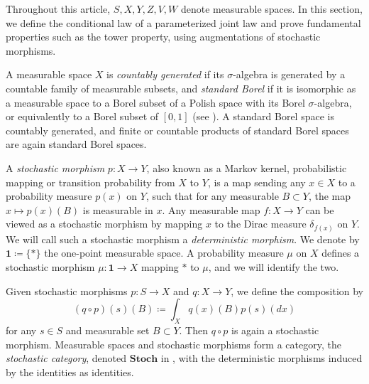 \documentclass[12pt,reqno]{amsart}%
\theoremstyle{plain}
\theoremstyle{definition}
\def\Stoch{\mathbf{Stoch}}
\def\bsone{\boldsymbol{1}}
\begin{document}
Throughout this article, $S,X,Y,Z,V,W$ denote measurable spaces.
In this section, we define the conditional law of a parameterized joint law
and prove fundamental properties such as the tower property, using augmentations of stochastic morphisms.

A measurable space $X$ is \emph{countably generated} if its $\sigma$-algebra is generated by
a countable family of measurable subsets, and \emph{standard Borel} if it is isomorphic as a measurable space
to a Borel subset of a Polish space with its Borel $\sigma$-algebra, or equivalently to a Borel subset of $[0,1]$ (see
\cite[Theorem~3.3.13]{Sri98}).
A standard Borel space is countably generated, and finite or countable products of 
standard Borel spaces are again standard Borel spaces.

A \emph{stochastic morphism} $p\colon X\rightarrow Y$, also known as a Markov kernel, probabilistic mapping
or transition probability from $X$ to $Y$,
 is a map sending any $x\in X$ to a
probability measure $p(x)$ on $Y$, such that for any measurable $B\subset Y$,
the map $x\mapsto p(x)(B)$ is measurable in $x$.
Any measurable map $f\colon X\rightarrow Y$ can be viewed
as a stochastic morphism by mapping $x$ to the Dirac measure $\delta_{f(x)}$ on $Y$.
We will call such a stochastic morphism a \emph{deterministic morphism}.
We denote by $\bsone\coloneqq\{*\}$ the one-point measurable space.
A probability measure $\mu$ on $X$ defines a stochastic morphism $\mu\colon\bsone\rightarrow X$
mapping $*$ to $\mu$,
and we will identify the two.

Given stochastic morphisms
$p\colon S\rightarrow X$ and $q\colon X\rightarrow Y$,
we define the composition by
\[
	(q\circ p)(s)(B)\coloneqq\int_Xq(x)(B)p(s)(dx)
\]
for any $s\in S$ and measurable set $B\subset Y$.
Then $q\circ p$ is again a stochastic morphism.
Measurable spaces and stochastic morphisms form a category, the \emph{stochastic category},
denoted $\Stoch$ in \cite{F20}, with the deterministic morphisms induced by the identities as identities.
\end{document}
